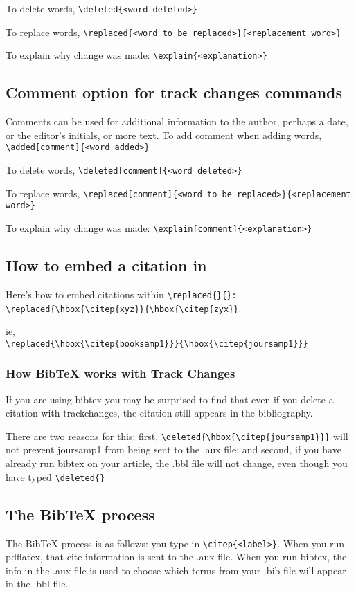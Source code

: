 \documentclass[preprint,trackchanges]{JASA}
\begin{document}
To delete words, \verb+\deleted{<word deleted>}+

To replace words, \verb+\replaced{<word to be replaced>}{<replacement word>}+

To explain why change was made: \verb+\explain{<explanation>}+


\subsection{Comment option for track changes commands}

Comments can be used for additional information to the author, perhaps
a date, or the editor's initials, or more text.
\vskip12pt
To add comment when adding words, \verb+\added[comment]{<word added>}+

To delete words, \verb+\deleted[comment]{<word deleted>}+

To replace words, \verb+\replaced[comment]{<word to be replaced>}{<replacement word>}+

To explain why change was made: \verb+\explain[comment]{<explanation>}+

\subsection{How to embed a citation in
{\tt\string\replace\string{\string}\string{\string}}}

Here's how to embed citations within \verb+\replaced{}{}:+\\
\verb+\replaced{\hbox{\citep{xyz}}{\hbox{\citep{zyx}}+.

ie,\\
\verb+\replaced{\hbox{\citep{booksamp1}}}{\hbox{\citep{joursamp1}}}+


\subsubsection{How BibTeX works with Track Changes}
If  you are using bibtex you may be surprised to find that even if you
delete a citation with trackchanges, the citation still appears in the bibliography.

There are two reasons for this: first,
\verb+\deleted{\hbox{\citep{joursamp1}}}+ will not prevent joursamp1 from
being sent to the .aux file; and second, if you have already run
bibtex on your article, the .bbl file will not change, even though
you have typed \verb+\deleted{}+

\subsection{The BibTeX process}
The BibTeX process is as follows: you type in \verb+\citep{<label>}+. When
you run pdflatex, that cite information is sent to the .aux file.
When you run bibtex, the info in the .aux file is used to choose
which terms from your .bib file will appear in the .bbl file.
\end{document}
